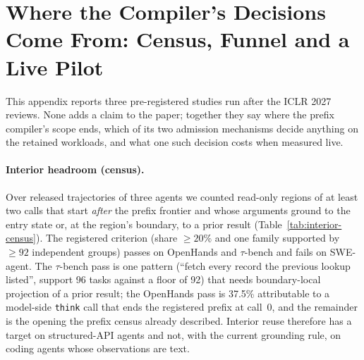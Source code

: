 \section{Where the Compiler's Decisions Come From: Census, Funnel and a Live Pilot}
\label{app:expansion-evidence}

This appendix reports three pre-registered studies run after the ICLR 2027 reviews. None adds a
claim to the paper; together they say where the prefix compiler's scope ends, which of its two
admission mechanisms decide anything on the retained workloads, and what one such decision costs
when measured live.

\paragraph{Interior headroom (census).}
Over released trajectories of three agents we counted read-only regions of at least two calls
that start \emph{after} the prefix frontier and whose arguments ground to the entry state or, at
the region's boundary, to a prior result (Table~\ref{tab:interior-census}). The registered
criterion (share $\ge 20\%$ and one family supported by $\ge 92$ independent groups) passes on
OpenHands and $\tau$-bench and fails on SWE-agent. The $\tau$-bench pass is one pattern
(``fetch every record the previous lookup listed'', support 96 tasks against a floor of 92) that
needs boundary-local projection of a prior result; the OpenHands pass is 37.5\% attributable to
a model-side \texttt{think} call that ends the registered prefix at call~0, and the remainder is
the opening the prefix census already described. Interior reuse therefore has a target on
structured-API agents and not, with the current grounding rule, on coding agents whose
observations are text.

\begin{table}[t]
  \centering\small
  \caption{Interior-region census (projected live-in policy; primary catalog). Families are
  canonical window hashes and bound a compiled program's support from above.}
  \label{tab:interior-census}
  
\end{table}

